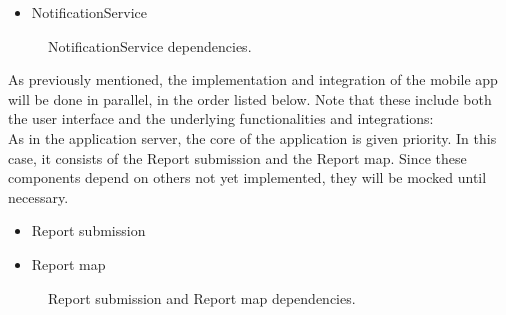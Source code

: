 \begin{itemize}
    \item 
    NotificationService
\end{itemize}

\begin{figure}[H]
    \centering
    \caption{\label{fig:NotificationService-dependencies}NotificationService dependencies.}
\end{figure}
 
As previously mentioned, the implementation and integration of the mobile app will be done in parallel, in the order listed below. Note that these include both the user interface and the underlying functionalities and integrations:\\

As in the application server, the core of the application is given priority. In this case, it consists of the Report submission and the Report map. Since these components depend on others not yet implemented, they will be mocked until necessary.

\begin{itemize}
    \item 
    Report submission
    \item 
    Report map
\end{itemize}

\begin{figure}[H]
    \centering
    \caption{\label{fig:reportsubmission-dependencies}Report submission and Report map dependencies.}
\end{figure}

